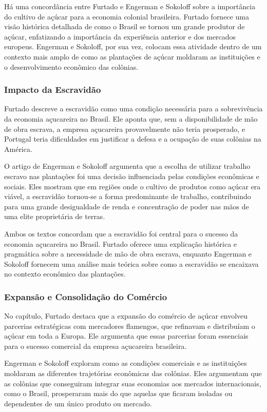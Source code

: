 \documentclass[a4paper,12pt]{article}[abntex2]
\begin{document}
Há uma concordância entre Furtado e Engerman e Sokoloff sobre a importância do cultivo de açúcar para a economia colonial brasileira. Furtado fornece uma visão histórica detalhada de como o Brasil se tornou um grande produtor de açúcar, enfatizando a importância da experiência anterior e dos mercados europeus. Engerman e Sokoloff, por sua vez, colocam essa atividade dentro de um contexto mais amplo de como as plantações de açúcar moldaram as instituições e o desenvolvimento econômico das colônias.

\subsubsection*{Impacto da Escravidão}

Furtado descreve a escravidão como uma condição necessária para a sobrevivência da economia açucareira no Brasil. Ele aponta que, sem a disponibilidade de mão de obra escrava, a empresa açucareira provavelmente não teria prosperado, e Portugal teria dificuldades em justificar a defesa e a ocupação de suas colônias na América.

O artigo de Engerman e Sokoloff argumenta que a escolha de utilizar trabalho escravo nas plantações foi uma decisão influenciada pelas condições econômicas e sociais. Eles mostram que em regiões onde o cultivo de produtos como açúcar era viável, a escravidão tornou-se a forma predominante de trabalho, contribuindo para uma grande desigualdade de renda e concentração de poder nas mãos de uma elite proprietária de terras.

Ambos os textos concordam que a escravidão foi central para o sucesso da economia açucareira no Brasil. Furtado oferece uma explicação histórica e pragmática sobre a necessidade de mão de obra escrava, enquanto Engerman e Sokoloff fornecem uma análise mais teórica sobre como a escravidão se encaixava no contexto econômico das plantações.

\subsubsection*{Expansão e Consolidação do Comércio}

No capítulo, Furtado destaca que a expansão do comércio de açúcar envolveu parcerias estratégicas com mercadores flamengos, que refinavam e distribuíam o açúcar em toda a Europa. Ele argumenta que essas parcerias foram essenciais para o sucesso comercial da empresa açucareira brasileira.

Engerman e Sokoloff exploram como as condições comerciais e as instituições moldaram as diferentes trajetórias econômicas das colônias. Eles argumentam que as colônias que conseguiram integrar suas economias aos mercados internacionais, como o Brasil, prosperaram mais do que aquelas que ficaram isoladas ou dependentes de um único produto ou mercado.
\end{document}
